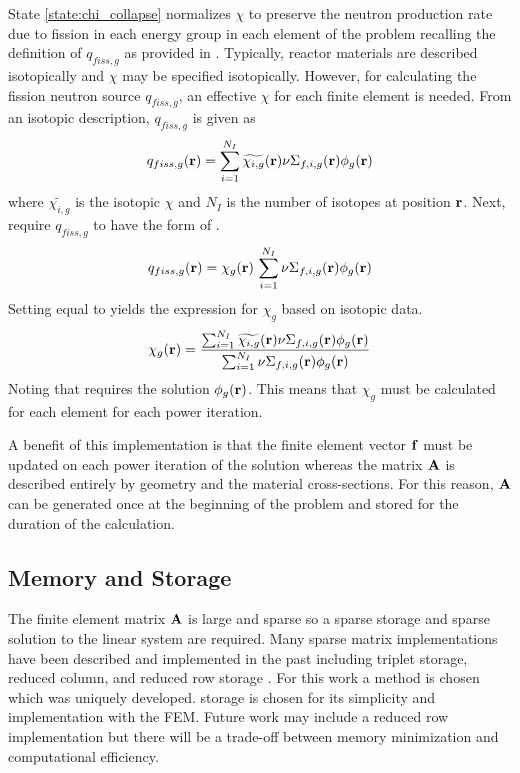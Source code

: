     State \ref{state:chi_collapse} normalizes $\chi$ to preserve the 
    neutron production rate due to fission in each energy group in each element
    of the problem recalling the definition of $q_{fiss,g}$ as provided in
    . Typically, reactor materials are described isotopically and 
    $\chi$ may be specified isotopically. However, for calculating the fission 
    neutron source $q_{fiss,g}$, an effective $\chi$ for each finite element is
    needed. From an isotopic description, $q_{fiss,g}$ is given as
    \begin{equation}
      \label{eq:isotopic_chi}
      q_{fiss,g}(\mathbf{r}) = \sum_{i=1}^{N_I} \widetilde{\chi_{i,g}}(\mathbf{r})
        \nu \Sigma_{f,i,g}(\mathbf{r}) \phi_g(\mathbf{r})
    \end{equation}
    where $\widetilde{\chi_{i,g}}$ is the isotopic $\chi$ and $N_I$ is the 
    number of isotopes at position $\mathbf{r}$. Next, require $q_{fiss,g}$ to have the 
    form of
    .
    \begin{equation}
      \label{eq:element_chi}
      q_{fiss,g}(\mathbf{r}) = \chi_g(\mathbf{r}) \, \sum_{i=1}^{N_I} \nu \Sigma_{f,i,g}(\mathbf{r})
        \phi_g(\mathbf{r})
    \end{equation}
    Setting  equal to  yields the
    expression for $\chi_g$ based on isotopic data.
    \begin{equation}
      \label{eq:chi_collapse}
      \chi_g(\mathbf{r}) = \frac{\sum_{i=1}^{N_I} \widetilde{\chi_{i,g}}(\mathbf{r})
        \nu \Sigma_{f,i,g}(\mathbf{r}) \phi_g(\mathbf{r})}
        {\sum_{i=1}^{N_I} \nu \Sigma_{f,i,g}(\mathbf{r}) \phi_g(\mathbf{r})}
    \end{equation}
    Noting that  requires the solution $\phi_g(\mathbf{r})$. This
    means that $\chi_g$ must be calculated for each element for each power
    iteration.
    
    A benefit of this implementation is that the finite element vector $\mathbf{f}$ 
    must be updated on each power iteration of the solution whereas the matrix 
    $\mathbf{A}$ is described entirely by geometry and the material cross-sections. For
    this reason, $\mathbf{A}$ can be generated once at the beginning of the problem and 
    stored for the duration of the calculation.
    \FloatBarrier %

  \subsection{Memory and Storage}
    The finite element matrix $\mathbf{A}$ is large and sparse so a sparse storage and
    sparse solution to the linear system are required. Many sparse matrix 
    implementations have been described and implemented in the past including
    triplet storage, reduced column, and reduced row storage \cite{sparseBLAS}.
    For this work a \twotable method is chosen which was uniquely 
    developed. \twotable storage is chosen for its simplicity and implementation
    with the FEM. Future work may include a reduced row implementation but there
    will be a trade-off between memory minimization and computational 
    efficiency.
    
